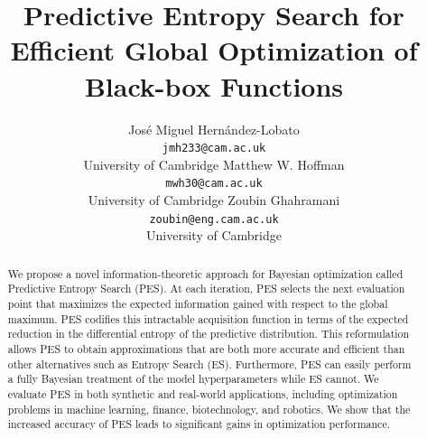 \documentclass{article}
\title{Predictive Entropy Search for Efficient Global Optimization of Black-box
Functions}
\author{
Jos\'e Miguel Hern\'andez-Lobato\\
\texttt{jmh233@cam.ac.uk}\\
University of Cambridge
\And
Matthew W. Hoffman\\
\texttt{mwh30@cam.ac.uk}\\
University of Cambridge
\And
Zoubin Ghahramani\\
\texttt{zoubin@eng.cam.ac.uk}\\
University of Cambridge
}
\begin{document}
\maketitle

\begin{abstract}
We propose a novel information-theoretic approach for Bayesian optimization
called Predictive Entropy Search (PES). At each iteration, PES selects the next
evaluation point that maximizes the expected information gained with respect to
the global maximum. PES codifies this intractable acquisition function in terms
of the expected reduction in the differential entropy of the predictive
distribution.  This reformulation allows PES to obtain approximations that are
both more accurate and efficient than other alternatives such as Entropy Search
(ES). Furthermore, PES can easily perform a fully Bayesian treatment of the model
hyperparameters while ES cannot. We evaluate PES in both synthetic and
real-world applications, including optimization problems in machine learning,
finance, biotechnology, and robotics. We show that the increased accuracy of PES
leads to significant gains in optimization performance.
\end{abstract}











\newpage
\addtolength{\bibsep}{-1pt}
{\small


}

\newpage
\appendix




\end{document}
